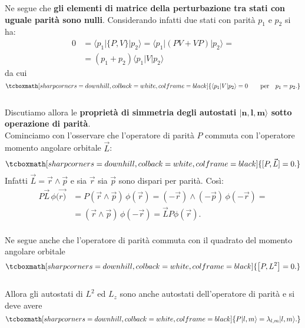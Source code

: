 \documentclass[a4paper,12pt,oneside]{book}
\begin{document}
Ne segue che \textbf{gli elementi di matrice della perturbazione tra stati con uguale parità sono nulli}. Considerando infatti due stati con parità $p_1$ e $p_2$ si ha:
	\begin{align}
		0 & =  \langle p_1 | \{ P,V \} |p_2\rangle= \langle p_1 | \left( PV+VP \right) |p_2 \rangle = \nonumber \\
		 & =  (p_1+p_2)\langle p_1|V|p_2\rangle 
	\end{align}
da cui 
	\begin{equation}
	\label{eq:cap23_2}
		\tcboxmath[sharp corners=downhill, colback=white, colframe=black]{
		\langle p_1| V |p_2\rangle=0 \qquad \textrm{per} \quad p_1=p_2.
		}
	\end{equation}\\
	
Discutiamo allora le \textbf{proprietà di simmetria degli autostati $\boldsymbol{|n,l,m \rangle}$ sotto operazione di parità}.\\

Cominciamo con l'osservare che l'operatore di parità $P$ commuta con l'operatore momento angolare orbitale $\vec{L}$:
	\begin{equation}
		\tcboxmath[sharp corners=downhill, colback=white, colframe=black]{
			[ P, \vec{L} ]=0.
			}
	\end{equation}
Infatti $\vec{L}=\vec{r}\wedge \vec{p}$ e sia $\vec{r}$ sia $\vec{p}$ sono dispari per parità. Così:
	\begin{align}
		P\vec{L}\, \phi(\vec{r)} & =  P(\vec{r}\wedge\vec{p})\, \phi(\vec{r})= (-\vec{r}) \wedge (-\vec{p})\,\phi(-\vec{r})= \nonumber \\
		& =  (\vec{r} \wedge \vec{p})\,\phi( -\vec{r})=\vec{L}P\phi(\vec{r}).
	\end{align}\\

Ne segue anche che l'operatore di parità commuta con il quadrato del momento angolare orbitale
	\begin{equation}
		\tcboxmath[sharp corners=downhill, colback=white, colframe=black]{
				\left[ P,L^2\right]=0.
				}
	\end{equation}\\

Allora gli autostati di $L^2$ ed $L_z$ sono anche autostati dell'operatore di parità e si deve avere
	\begin{equation}
		\tcboxmath[sharp corners=downhill, colback=white, colframe=black]{
			P|l,m\rangle=\lambda_{l,m}|l,m\rangle.
			}
	\end{equation}\\
\end{document}
